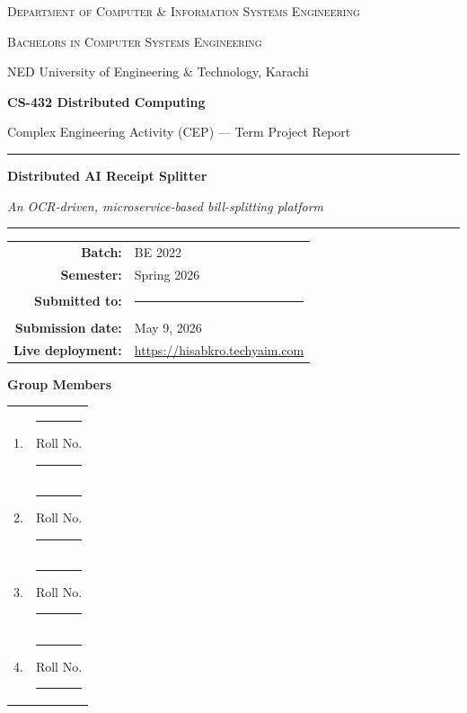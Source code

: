 \documentclass[11pt, a4paper]{article}
\begin{document}
\begin{titlepage}
\centering
\vspace*{1.5cm}
{\large \textsc{Department of Computer \& Information Systems Engineering}\par}
{\large \textsc{Bachelors in Computer Systems Engineering}\par}
\vspace{0.4cm}
{\normalsize NED University of Engineering \& Technology, Karachi\par}
\vspace{2.5cm}
{\Large\bfseries CS-432 Distributed Computing\par}
{\large Complex Engineering Activity (CEP) — Term Project Report\par}
\vspace{1.5cm}
\rule{\linewidth}{0.5pt}\vspace{0.6cm}
{\Huge\bfseries\color{accent} Distributed AI Receipt Splitter\par}
\vspace{0.4cm}
{\large\itshape An OCR-driven, microservice-based bill-splitting platform\par}
\vspace{0.2cm}
\rule{\linewidth}{0.5pt}
\vfill

\begin{tabular}{rl}
\textbf{Batch:}     & BE 2022 \\
\textbf{Semester:}  & Spring 2026 \\
\textbf{Submitted to:} & \rule{6cm}{0.4pt} \\
\textbf{Submission date:} & May 9, 2026 \\
\textbf{Live deployment:} & \url{https://hisabkro.techyaim.com} \\
\end{tabular}

\vspace{1cm}

\textbf{Group Members}\\[0.3em]
\begin{tabular}{ll}
1. & \rule{6cm}{0.4pt} \quad Roll No. \rule{2.5cm}{0.4pt} \\
2. & \rule{6cm}{0.4pt} \quad Roll No. \rule{2.5cm}{0.4pt} \\
3. & \rule{6cm}{0.4pt} \quad Roll No. \rule{2.5cm}{0.4pt} \\
4. & \rule{6cm}{0.4pt} \quad Roll No. \rule{2.5cm}{0.4pt} \\
\end{tabular}
\end{titlepage}
\end{document}

